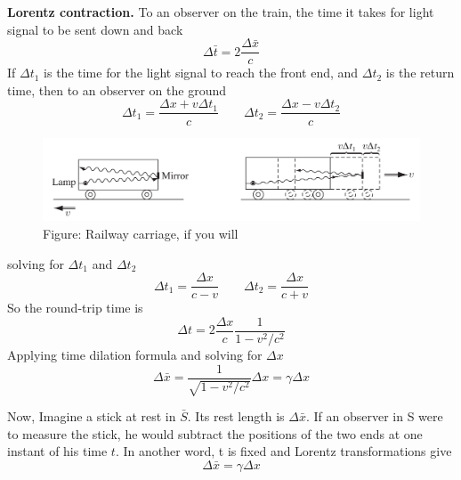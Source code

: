 \documentclass[../main.tex]{subfiles}
\begin{document}
\textbf{Lorentz contraction.} To an observer on the train, the time it takes for light signal to be sent down and back 
\begin{equation*}
    \Delta \bar{t}=2\frac{\Delta \bar{x}}{c}
\end{equation*}
If $\Delta t_1$ is the time for the light signal to reach the front end, and $\Delta t_2$ is the return time, then to an observer on the ground
\begin{equation*}
    \Delta t_1=\frac{\Delta x+v\Delta t_1}{c}\qquad \Delta t_2=\frac{\Delta x-v\Delta t_2}{c}
\end{equation*}
\begin{figure}[b]
    \centering
    \includegraphics[width=\textwidth]{../Rss/Relativity/LorentzContraction.png}
    \caption*{Figure: Railway carriage, if you will}
\end{figure}
solving for $\Delta t_1$ and $\Delta t_2$
\begin{equation*}
    \Delta t_1=\frac{\Delta x}{c-v}\qquad \Delta t_2=\frac{\Delta x}{c+v}
\end{equation*}
So the round-trip time is
\begin{equation*}
    \Delta t=2\frac{\Delta x}{c}\frac{1}{1-v^2/c^2}
\end{equation*}
Applying time dilation formula and solving for $\Delta x$
\begin{equation*}
    \Delta \bar{x}=\frac{1}{\sqrt{1-v^2/c^2}}\Delta x=\gamma \Delta x
\end{equation*}

Now, Imagine a stick at rest in $\bar{S}$. Its rest length is $\Delta \bar{x}$. If an observer in S were to measure the stick, he would subtract the positions of the two ends at one instant of his time $t$. In another word, t is fixed and Lorentz transformations give
\begin{equation*}
    \Delta \bar{x}=\gamma \Delta x
\end{equation*}
\end{document}
